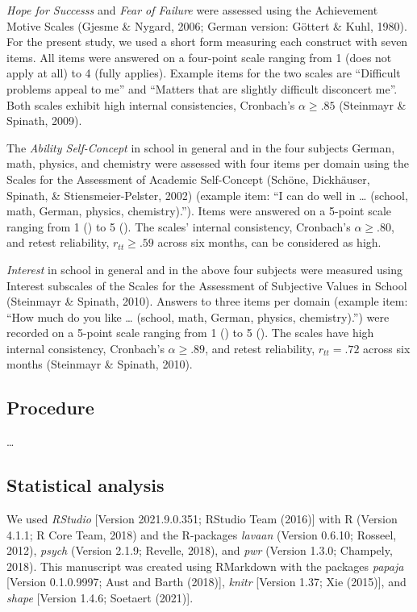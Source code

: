 \documentclass[
  man]{apa6}
\begin{document}
\emph{Hope for Successs} and \emph{Fear of Failure} were assessed using the Achievement Motive Scales (Gjesme \& Nygard, 2006; German version: Göttert \& Kuhl, 1980). For the present study, we used a short form measuring each construct with seven items. All items were answered on a four-point scale ranging from 1 (does not apply at all) to 4 (fully applies). Example items for the two scales are ``Difficult problems appeal to me'' and ``Matters that are slightly difficult disconcert me''. Both scales exhibit high internal consistencies, Cronbach's \(\alpha\ge.85\) (Steinmayr \& Spinath, 2009).

The \emph{Ability Self-Concept} in school in general and in the four subjects German, math, physics, and chemistry were assessed with four items per domain using the Scales for the Assessment of Academic Self-Concept (Schöne, Dickhäuser, Spinath, \& Stiensmeier-Pelster, 2002) (example item: ``I can do well in \ldots{} (school, math, German, physics, chemistry).''). Items were answered on a 5-point scale ranging from 1 () to 5 (). The scales' internal consistency, Cronbach's \(\alpha\ge.80\), and retest reliability, \(r_{tt}\ge.59\) across six months, can be considered as high.

\emph{Interest} in school in general and in the above four subjects were measured using Interest subscales of the Scales for the Assessment of Subjective Values in School (Steinmayr \& Spinath, 2010). Answers to three items per domain (example item: ``How much do you like \ldots{} (school, math, German, physics, chemistry).'') were recorded on a 5-point scale ranging from 1 () to 5 (). The scales have high internal consistency, Cronbach's \(\alpha\ge.89\), and retest reliability, \(r_{tt} = .72\) across six months (Steinmayr \& Spinath, 2010).

\hypertarget{procedure}{%
\subsection{Procedure}\label{procedure}}

\ldots{}

\hypertarget{statistical-analysis}{%
\subsection{Statistical analysis}\label{statistical-analysis}}

We used \emph{RStudio} {[}Version 2021.9.0.351; RStudio Team (2016){]} with R (Version 4.1.1; R Core Team, 2018) and the R-packages \emph{lavaan} (Version 0.6.10; Rosseel, 2012), \emph{psych} (Version 2.1.9; Revelle, 2018), and \emph{pwr} (Version 1.3.0; Champely, 2018). This manuscript was created using RMarkdown with the packages \emph{papaja} {[}Version 0.1.0.9997; Aust and Barth (2018){]}, \emph{knitr} {[}Version 1.37; Xie (2015){]}, and \emph{shape} {[}Version 1.4.6; Soetaert (2021){]}.
\end{document}
